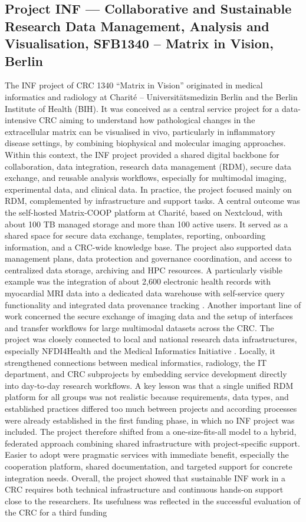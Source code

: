 \documentclass{eceasst}
\begin{document}
\subsection{Project INF --- Collaborative and Sustainable Research Data Management, Analysis and Visualisation, SFB1340 -- Matrix in Vision, Berlin} \label{sec:sfb1340}
The INF project of CRC 1340 “Matrix in Vision” originated in medical informatics and radiology at Charité – Universitätsmedizin Berlin and the Berlin Institute of Health (BIH). It was conceived as a central service project for a data-intensive CRC aiming to understand how pathological changes in the extracellular matrix can be visualised in vivo, particularly in inflammatory disease settings, by combining biophysical and molecular imaging approaches. Within this context, the INF project provided a shared digital backbone for collaboration, data integration, research data management (RDM), secure data exchange, and reusable analysis workflows, especially for multimodal imaging, experimental data, and clinical data. In practice, the project focused mainly on RDM, complemented by infrastructure and support tasks. A central outcome was the self-hosted Matrix-COOP platform at Charité, based on Nextcloud, with about 100 TB managed storage and more than 100 active users. It served as a shared space for secure data exchange, templates, reporting, onboarding information, and a CRC-wide knowledge base. The project also supported data management plans, data protection and governance coordination, and access to centralized data storage, archiving and HPC resources. A particularly visible example was the integration of about 2,600 electronic health records with myocardial MRI data into a dedicated data warehouse with self-service query functionality and integrated data provenance tracking \cite{johns_prov_tracking_2025}. Another important line of work concerned the secure exchange of imaging data and the setup of interfaces and transfer workflows for large multimodal datasets across the CRC. The project was closely connected to local and national research data infrastructures, especially NFDI4Health \cite{fluck_bausteine_2021} and the Medical Informatics Initiative \cite{prasser_difuture_2018}. Locally, it strengthened connections between medical informatics, radiology, the IT department, and CRC subprojects by embedding service development directly into day-to-day research workflows. A key lesson was that a single unified RDM platform for all groups was not realistic because requirements, data types, and established practices differed too much between projects and according processes were already established in the first funding phase, in which no INF project was included. The project therefore shifted from a one-size-fits-all model to a hybrid, federated approach combining shared infrastructure with project-specific support. Easier to adopt were pragmatic services with immediate benefit, especially the cooperation platform, shared documentation, and targeted support for concrete integration needs. Overall, the project showed that sustainable INF work in a CRC requires both technical infrastructure and continuous hands-on support close to the researchers. Its usefulness was reflected in the successful evaluation of the CRC for a third funding 
\end{document}
